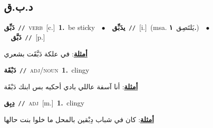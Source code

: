 \documentclass[10pt,a4paper,twoside]{article} %
\begin{document}
\begin{multicols}{2}
{{{\vspace{-3mm}
\subsection*{\color{blue}\foreignlanguage{arabic}{د.ب.ق}\color{blue}{}} 

{\setlength\topsep{0pt}\textbf{\foreignlanguage{arabic}{دَبِّق}}\ {\color{gray}\texttt{//}\color{black}}\ \textsc{verb}\ [c.]\ \textbf{1.}~be sticky\ \ $\bullet$\ \ \setlength\topsep{0pt}\textbf{\foreignlanguage{arabic}{يدَبِّق}}\ {\color{gray}\texttt{//}\color{black}}\ [i.]\ \color{gray}(msa. \foreignlanguage{arabic}{يَلتَصِق}~\foreignlanguage{arabic}{\textbf{١.}})\color{black}\ \ $\bullet$\ \ \setlength\topsep{0pt}\textbf{\foreignlanguage{arabic}{دَبَّق}}\ {\color{gray}\texttt{//}\color{black}}\ [p.]\  \begin{flushright}\color{gray}\foreignlanguage{arabic}{\textbf{\underline{\foreignlanguage{arabic}{أمثلة}}}: في علكة دَبَّقَت بشعري}\end{flushright}\color{black}} \vspace{2mm}

{\setlength\topsep{0pt}\textbf{\foreignlanguage{arabic}{دَبْقَة}}\ {\color{gray}\texttt{//}\color{black}}\ \textsc{adj/noun}\ \textbf{1.}~clingy\  \begin{flushright}\color{gray}\foreignlanguage{arabic}{\textbf{\underline{\foreignlanguage{arabic}{أمثلة}}}: أنا آسفة عاللي بادي أحكيه بس ابنك دَبْقَة}\end{flushright}\color{black}} \vspace{2mm}

{\setlength\topsep{0pt}\textbf{\foreignlanguage{arabic}{دِبِق}}\ {\color{gray}\texttt{//}\color{black}}\ \textsc{adj}\ [m.]\ \textbf{1.}~clingy\  \begin{flushright}\color{gray}\foreignlanguage{arabic}{\textbf{\underline{\foreignlanguage{arabic}{أمثلة}}}: كان في شباب دِبْقين بالمحل ما خلوا بنت حالها}\end{flushright}\color{black}} \vspace{2mm}

}}}
\end{multicols}
\end{document}
